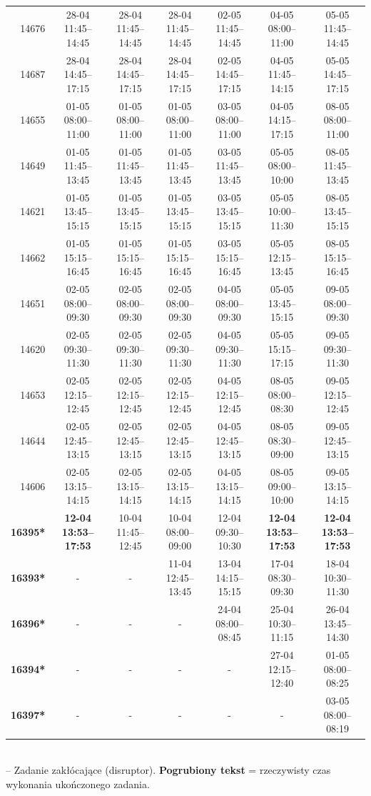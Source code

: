 \begin{table}[htbp]
\begin{tabular}{|r|c|c|c|c|c|c|}
14676 & 28-04 11:45--14:45 & 28-04 11:45--14:45 & 28-04 11:45--14:45 & 02-05 11:45--14:45 & 04-05 08:00--11:00 & 05-05 11:45--14:45 \\ 
14687 & 28-04 14:45--17:15 & 28-04 14:45--17:15 & 28-04 14:45--17:15 & 02-05 14:45--17:15 & 04-05 11:45--14:15 & 05-05 14:45--17:15 \\ 
14655 & 01-05 08:00--11:00 & 01-05 08:00--11:00 & 01-05 08:00--11:00 & 03-05 08:00--11:00 & 04-05 14:15--17:15 & 08-05 08:00--11:00 \\ 
14649 & 01-05 11:45--13:45 & 01-05 11:45--13:45 & 01-05 11:45--13:45 & 03-05 11:45--13:45 & 05-05 08:00--10:00 & 08-05 11:45--13:45 \\ 
14621 & 01-05 13:45--15:15 & 01-05 13:45--15:15 & 01-05 13:45--15:15 & 03-05 13:45--15:15 & 05-05 10:00--11:30 & 08-05 13:45--15:15 \\ 
14662 & 01-05 15:15--16:45 & 01-05 15:15--16:45 & 01-05 15:15--16:45 & 03-05 15:15--16:45 & 05-05 12:15--13:45 & 08-05 15:15--16:45 \\ 
14651 & 02-05 08:00--09:30 & 02-05 08:00--09:30 & 02-05 08:00--09:30 & 04-05 08:00--09:30 & 05-05 13:45--15:15 & 09-05 08:00--09:30 \\ 
14620 & 02-05 09:30--11:30 & 02-05 09:30--11:30 & 02-05 09:30--11:30 & 04-05 09:30--11:30 & 05-05 15:15--17:15 & 09-05 09:30--11:30 \\ 
14653 & 02-05 12:15--12:45 & 02-05 12:15--12:45 & 02-05 12:15--12:45 & 04-05 12:15--12:45 & 08-05 08:00--08:30 & 09-05 12:15--12:45 \\ 
14644 & 02-05 12:45--13:15 & 02-05 12:45--13:15 & 02-05 12:45--13:15 & 04-05 12:45--13:15 & 08-05 08:30--09:00 & 09-05 12:45--13:15 \\ 
14606 & 02-05 13:15--14:15 & 02-05 13:15--14:15 & 02-05 13:15--14:15 & 04-05 13:15--14:15 & 08-05 09:00--10:00 & 09-05 13:15--14:15 \\ 
\hline
\textbf{16395*} & \textbf{12-04 13:53--17:53} & 10-04 11:45--12:45 & 10-04 08:00--09:00 & 12-04 09:30--10:30 & \textbf{12-04 13:53--17:53} & \textbf{12-04 13:53--17:53} \\ 
\textbf{16393*} & - & - & 11-04 12:45--13:45 & 13-04 14:15--15:15 & 17-04 08:30--09:30 & 18-04 10:30--11:30 \\ 
\textbf{16396*} & - & - & - & 24-04 08:00--08:45 & 25-04 10:30--11:15 & 26-04 13:45--14:30 \\ 
\textbf{16394*} & - & - & - & - & 27-04 12:15--12:40 & 01-05 08:00--08:25 \\ 
\textbf{16397*} & - & - & - & - & - & 03-05 08:00--08:19 \\ 
\hline
\end{tabular}
\\ {\tiny * -- Zadanie zakłócające (disruptor). \textbf{Pogrubiony tekst} = rzeczywisty czas wykonania ukończonego zadania.}
\end{table}

\vspace{0.8cm}
